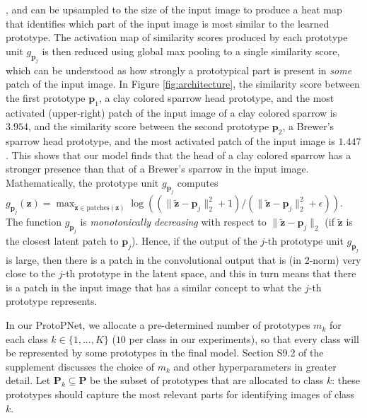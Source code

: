\documentclass{article}
\theoremstyle{definition}
\theoremstyle{remark}
\begin{document}
, and can be upsampled to the size of the input image to produce a heat map that identifies which part of the input image is most similar to the learned prototype. The activation map of similarity scores produced by each prototype unit $g_{\mathbf{p}_j}$ is then reduced using global max pooling to a single similarity score, which can be understood as how strongly a prototypical part is present in \textit{some} patch of the input image. In Figure \ref{fig:architecture}, the similarity score between the first prototype $\mathbf{p}_1$, a clay colored sparrow head prototype, and the most activated (upper-right) patch of the input image of a clay colored sparrow is $3.954$, and the similarity score between the second prototype $\mathbf{p}_2$, a Brewer's sparrow head prototype, and the most activated patch of the input image is $1.447$. This shows that our model finds that the head of a clay colored sparrow has a stronger presence than that of a Brewer's sparrow in the input image. Mathematically, the prototype unit $g_{\mathbf{p}_j}$ computes $g_{\mathbf{p}_j}(\mathbf{z}) = \max_{\tilde{\mathbf{z}} \in \text{patches}(\mathbf{z})}
\log\left((\|\tilde{\mathbf{z}}-\mathbf{p}_j\|_2^2 + 1)/(\|\tilde{\mathbf{z}}-\mathbf{p}_j\|_2^2 + \epsilon)\right)$.
The function $g_{\mathbf{p}_j}$ is \textit{monotonically decreasing} with respect to $\|\tilde{\mathbf{z}}-\mathbf{p}_j\|_2$ (if $\tilde{\mathbf{z}}$ is the closest latent patch to $\mathbf{p}_j$). Hence, if the output of the $j$-th prototype unit $g_{\mathbf{p}_j}$ is large, then there is a patch in the convolutional output that is (in $2$-norm) very close to the $j$-th prototype in the latent space, and this in turn means that there is a patch in the input image that has a similar concept to what the $j$-th prototype represents.

In our ProtoPNet, we allocate a pre-determined number of prototypes $m_k$ for each class $k \in \{1, ..., K\}$ ($10$ per class in our experiments), so that every class will be represented by some prototypes in the final model.
Section S9.2 of the supplement discusses the choice of $m_k$ and other hyperparameters in greater detail.
Let $\mathbf{P}_k \subseteq \mathbf{P}$ be the subset of prototypes that are allocated to class $k$: these prototypes should capture the most relevant parts for identifying images of class $k$. %
\end{document}
